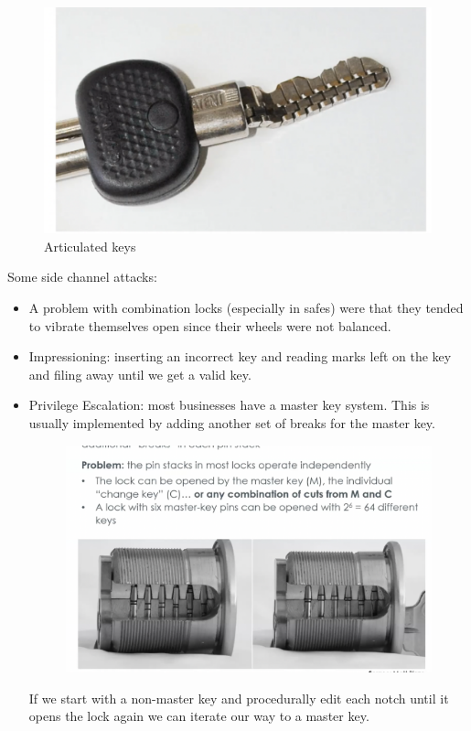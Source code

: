 \documentclass[../notes.tex]{subfiles}
\begin{document}
\begin{figure}[H]
    \centering
    \includegraphics[width=0.8\linewidth]{img/image_2023-04-16-21-12-18.png}
    \caption{Articulated keys}
\end{figure}

Some side channel attacks:

\begin{itemize}
    \item  A problem with combination locks (especially in safes) were that they tended to vibrate themselves open since their wheels were not balanced.
    \item Impressioning: inserting an incorrect key and reading marks left on the key and filing away until we get a valid key.
    \item Privilege Escalation: most businesses have a master key system. This is usually implemented by adding another set of breaks for the master key. 
        \begin{figure}[H]
            \centering
            \includegraphics[width=0.8\linewidth]{img/image_2023-04-16-21-15-26.png}
        \end{figure}

        If we start with a non-master key and procedurally edit each notch until it opens the lock again we can iterate our way to a master key.
\end{itemize}
\end{document}
